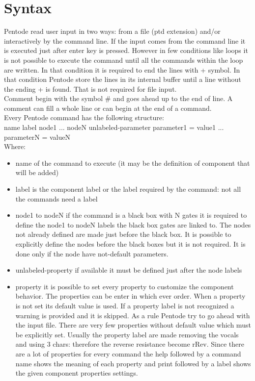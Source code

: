 \documentclass[12pt,a4paper]{book}
\begin{document}
\section{Syntax}
Pentode read user input in two ways: from a file (ptd extension) and/or interactively by the command line. If the input comes from the command line it is executed just after enter key is pressed. However in few conditions like loops it is not possible to execute the command until all the commands within the loop are written. In that condition it is required to end the lines with + symbol. In that condition Pentode store the lines in its internal buffer until a line without the ending + is found. That is not required for file input.\\
Comment begin with the symbol \# and goes ahead up to the end of line. A comment can fill a whole line or can begin at the end of a command.\\
Every Pentode command has the following structure:\\
name label node1 ... nodeN unlabeled-parameter parameter1 = value1 ... parameterN = valueN\\
Where:
\begin{itemize}
\item name of the command to execute (it may be the definition of component that will be added) 
\item label is the component label or the label required by the command: not all the commands need a label
\item node1 to nodeN if the command is a black box with N gates it is required to define the node1 to nodeN labels the black box gates are linked to. The nodes not already defined are made just before the black box. It is possible to explicitly define the nodes before the black boxes but it is not required. It is done only if the node have not-default parameters.
\item unlabeled-property if available it must be defined just after the node labels
\item property it is possible to set every property to customize the component behavior. The properties can be enter in which ever order. When a property is not set its default value is used. If a property label is not recognized a warning is provided and it is skipped. As a rule Pentode try to go ahead with the input file. There are very few properties without default value which must be explicitly set. Usually the property label are made removing the vocals and using 3 chars: therefore the reverse resistance become rRev. Since there are a lot of properties for every command the help followed by a command name shows the meaning of each property and print followed by a label shows the given component properties settings.
\end{itemize}
\end{document}
